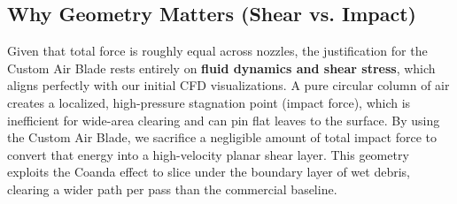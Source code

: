 \documentclass{article}
\begin{document}
\subsection{Why Geometry Matters (Shear vs. Impact)}
Given that total force is roughly equal across nozzles, the justification for the Custom Air Blade rests entirely on \textbf{fluid dynamics and shear stress}, which aligns perfectly with our initial CFD visualizations. A pure circular column of air creates a localized, high-pressure stagnation point (impact force), which is inefficient for wide-area clearing and can pin flat leaves to the surface. By using the Custom Air Blade, we sacrifice a negligible amount of total impact force to convert that energy into a high-velocity planar shear layer. This geometry exploits the Coanda effect to slice under the boundary layer of wet debris, clearing a wider path per pass than the commercial baseline.
\end{document}
